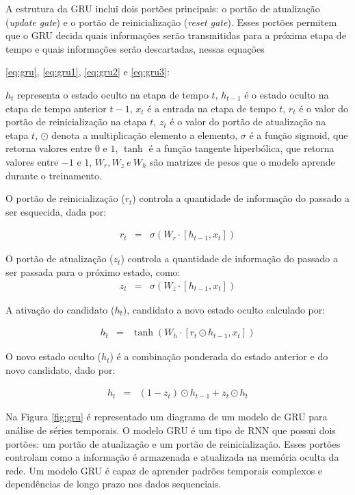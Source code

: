 A estrutura da GRU inclui dois portões principais: o portão de atualização (\textit{update gate}) e o portão de reinicialização (\textit{reset gate}). Esses portões permitem que o GRU decida quais informações serão transmitidas para a próxima etapa de tempo e quais informações serão descartadas, nessas equações 
 
 \eqref{eq:gru}, \eqref{eq:gru1}, \eqref{eq:gru2} e \eqref{eq:gru3}:
 
$ h_t $ representa o estado oculto na etapa de tempo $ t $, $ h_{t-1} $ é o estado oculto na etapa de tempo anterior $ t-1 $, $ x_t $ é a entrada na etapa de tempo $ t $, $ r_t $ é o valor do portão de reinicialização na etapa $ t $, $ z_t $ é o valor do portão de atualização na etapa $ t $, $ \odot $ denota a multiplicação elemento a elemento, $ \sigma $ é a função sigmoid, que retorna valores entre $0$ e $1$, $ \tanh $ é a função tangente hiperbólica, que retorna valores entre $-1$ e $1$, $ W_r, W_z\ e\ W_h $ são matrizes de pesos que o modelo aprende durante o treinamento.
 
O portão de reinicialização ($r_t$) controla a quantidade de informação do passado a ser esquecida, dada por:
 	
 	\begin{eqnarray}
 		r_t &=& \sigma(W_r \cdot [h_{t-1}, x_t])\label{eq:gru}
 	\end{eqnarray} 
 	
O portão de atualização ($z_t$) controla a quantidade de informação do passado a ser passada para o próximo estado, como:
 	\begin{eqnarray}
 		z_t &=& \sigma(W_z \cdot [h_{t-1}, x_t])\label{eq:gru1}
 	\end{eqnarray}
 
A ativação do candidato ($h\widetilde{_t}$), candidato a novo estado oculto calculado por:
 	
 	\begin{eqnarray}
 		h\widetilde{_t} &=& \tanh\left(W_h \cdot [r_t \odot h_{t-1}, x_t]\right)\label{eq:gru2}
 	\end{eqnarray}
 	
O novo estado oculto ($h_t$) é a combinação ponderada do estado anterior e do novo candidato, dado por:
 
 	\begin{eqnarray}
 		h_t &=& (1 - z_t) \odot h_{t-1} + z_t \odot h\widetilde{_t}\label{eq:gru3}
 	\end{eqnarray}
 
 Na Figura \ref{fig:gru} é representado um diagrama de um modelo de GRU para análise de séries temporais. O modelo GRU é um tipo de RNN que possui dois portões: um portão de atualização e um portão de reinicialização. Esses portões controlam como a informação é armazenada e atualizada na memória oculta da rede. Um modelo GRU é capaz de aprender padrões temporais complexos e dependências de longo prazo nos dados sequenciais. 
 

